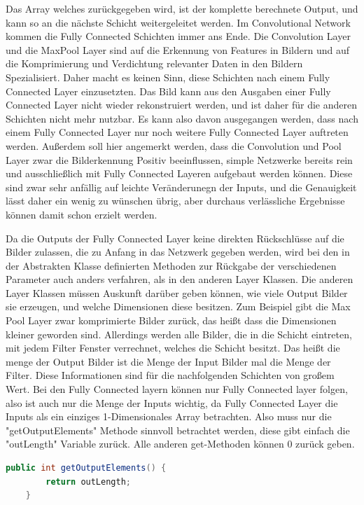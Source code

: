 \documentclass[12pt]{article}
\begin{document}
Das Array welches zurückgegeben wird, ist der komplette berechnete Output, und kann so an die nächste Schicht weitergeleitet werden. Im Convolutional Network kommen die Fully Connected Schichten immer ans Ende. Die Convolution Layer und die MaxPool Layer sind auf die Erkennung von Features in Bildern und auf die Komprimierung und Verdichtung relevanter Daten in den Bildern Spezialisiert. Daher macht es keinen Sinn, diese Schichten nach einem Fully Connected Layer einzusetzten. Das Bild kann aus den Ausgaben einer Fully Connected Layer nicht wieder rekonstruiert werden, und ist daher für die anderen Schichten nicht mehr nutzbar. Es kann also davon ausgegangen werden, dass nach einem Fully Connected Layer nur noch weitere Fully Connected Layer auftreten werden. 
Außerdem soll hier angemerkt werden, dass die Convolution und Pool Layer zwar die Bilderkennung Positiv beeinflussen, simple Netzwerke bereits rein und ausschließlich mit Fully Connected Layeren aufgebaut werden können. Diese sind zwar sehr anfällig auf leichte Veränderunegn der Inputs, und die Genauigkeit lässt daher ein wenig zu wünschen übrig, aber durchaus verlässliche Ergebnisse können damit schon erzielt werden.

Da die Outputs der Fully Connected Layer keine direkten Rückschlüsse auf die Bilder zulassen, die zu Anfang in das Netzwerk gegeben werden, wird bei den in der Abstrakten Klasse definierten Methoden zur Rückgabe der verschiedenen Parameter auch anders verfahren, als in den anderen Layer Klassen. Die anderen Layer Klassen müssen Auskunft darüber geben können, wie viele Output Bilder sie erzeugen, und welche Dimensionen diese besitzen. Zum Beispiel gibt die Max Pool Layer zwar komprimierte Bilder zurück, das heißt dass die Dimensionen kleiner geworden sind. Allerdings werden alle Bilder, die in die Schicht eintreten, mit jedem Filter Fenster verrechnet, welches die Schicht besitzt. Das heißt die menge der Output Bilder ist die Menge der Input Bilder mal die Menge der Filter. Diese Informationen sind für die nachfolgenden Schichten von großem Wert. Bei den Fully Connected layern können nur Fully Connected layer folgen, also ist auch nur die Menge der Inputs wichtig, da Fully Connected Layer die Inputs als ein einziges 1-Dimensionales Array betrachten. Also muss nur die "getOutputElements" Methode sinnvoll betrachtet werden, diese gibt einfach die "outLength" Variable zurück. Alle anderen get-Methoden können 0 zurück geben.

\begin{lstlisting}[language=Java] 
    public int getOutputElements() {
        return outLength;
    }
\end{lstlisting} 
\clearpage
\end{document}
